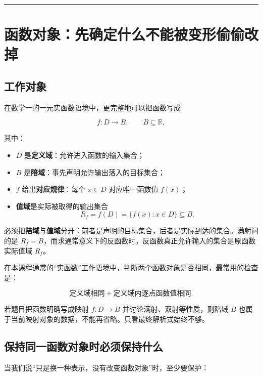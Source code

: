 \documentclass[11pt,a4paper]{ctexart}
\providecommand{\tightlist}{}
\begin{document}
\begin{center}\rule{0.5\linewidth}{0.5pt}\end{center}

\section{函数对象：先确定什么不能被变形偷偷改掉}\label{ux51fdux6570ux5bf9ux8c61ux5148ux786eux5b9aux4ec0ux4e48ux4e0dux80fdux88abux53d8ux5f62ux5077ux5077ux6539ux6389}

\subsection{工作对象}\label{ux5de5ux4f5cux5bf9ux8c61}

在数学一的一元实函数语境中，更完整地可以把函数写成

\[
f:D\to B,\qquad B\subseteq\mathbb R,
\]

其中：

\begin{itemize}
\tightlist
\item
  \(D\) 是\textbf{定义域}：允许进入函数的输入集合；
\item
  \(B\) 是\textbf{陪域}：事先声明允许输出落入的目标集合；
\item
  \(f\) 给出\textbf{对应规律}：每个 \(x\in D\) 对应唯一函数值 \(f(x)\)；
\item
  \textbf{值域}是实际被取得的输出集合 \[
  R_f=f(D)=\{f(x):x\in D\}\subseteq B.
  \]
\end{itemize}

必须把\textbf{陪域}与\textbf{值域}分开：前者是声明的目标集合，后者是实际到达的集合。满射问的是
\(R_f=B\)，而求通常意义下的反函数时，反函数真正允许输入的集合是原函数实际值域
\(R_f\)。

在本课程通常的``实函数''工作语境中，判断两个函数对象是否相同，最常用的检查是：

\[
\boxed{\text{定义域相同}+\text{定义域内逐点函数值相同}.}
\]

若题目把函数明确写成映射 \(f:D\to B\) 并讨论满射、双射等性质，则陪域 \(B\) 也属于当前映射对象的数据，不能再省略。只看最终解析式始终不够。

\subsection{保持同一函数对象时必须保持什么}\label{ux5bf9ux8c61ux8eabux4efdux7684ux4e0dux53d8ux91cf}

当我们说``只是换一种表示，没有改变函数对象''时，至少要保护：
\end{document}

